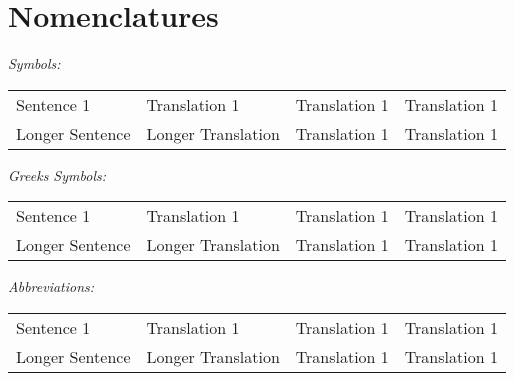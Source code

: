 \newpage
\thispagestyle{empty}
\section*{Nomenclatures} 
\flushleft

\textit{Symbols:}

\begin{tabular}{llll}
Sentence 1 & Translation 1 & Translation 1 & Translation 1 \\
Longer Sentence & Longer Translation & Translation 1 & Translation 1\\
\end{tabular}

\textit{Greeks Symbols:}

\begin{tabular}{llll}
Sentence 1 & Translation 1 & Translation 1 & Translation 1 \\
Longer Sentence & Longer Translation & Translation 1 & Translation 1\\
\end{tabular}

\textit{Abbreviations:}

\begin{tabular}{llll}
Sentence 1 & Translation 1 & Translation 1 & Translation 1 \\
Longer Sentence & Longer Translation & Translation 1 & Translation 1\\
\end{tabular}